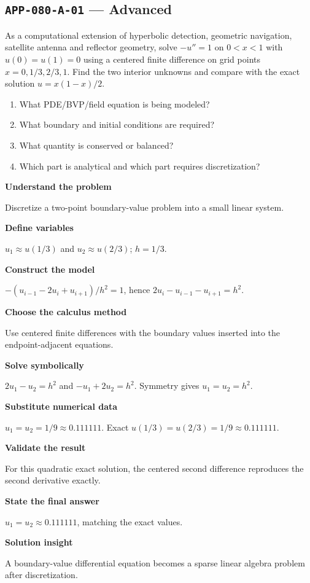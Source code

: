 \documentclass[11pt]{book}
\newcommand{\pid}[1]{\texttt{#1}}
\begin{document}
\subsection*{\pid{APP-080-A-01} — Advanced}
\begin{problembox}
As a computational extension of hyperbolic detection, geometric navigation, satellite antenna and reflector geometry, solve $-u''=1$ on $0<x<1$ with $u(0)=u(1)=0$ using a centered finite difference on grid points $x=0,1/3,2/3,1$. Find the two interior unknowns and compare with the exact solution $u=x(1-x)/2$.
\end{problembox}
\begin{promptbox}\begin{enumerate}
\item What PDE/BVP/field equation is being modeled?
\item What boundary and initial conditions are required?
\item What quantity is conserved or balanced?
\item Which part is analytical and which part requires discretization?
\end{enumerate}\end{promptbox}
\begin{solutionbox}
\textbf{Understand the problem}\par Discretize a two-point boundary-value problem into a small linear system.\par\medskip
\textbf{Define variables}\par $u_1\approx u(1/3)$ and $u_2\approx u(2/3)$; $h=1/3$.\par\medskip
\textbf{Construct the model}\par $-(u_{i-1}-2u_i+u_{i+1})/h^2=1$, hence $2u_i-u_{i-1}-u_{i+1}=h^2$.\par\medskip
\textbf{Choose the calculus method}\par Use centered finite differences with the boundary values inserted into the endpoint-adjacent equations.\par\medskip
\textbf{Solve symbolically}\par $2u_1-u_2=h^2$ and $-u_1+2u_2=h^2$. Symmetry gives $u_1=u_2=h^2$.\par\medskip
\textbf{Substitute numerical data}\par $u_1=u_2=1/9\approx 0.111111$. Exact $u(1/3)=u(2/3)=1/9\approx 0.111111$.\par\medskip
\textbf{Validate the result}\par For this quadratic exact solution, the centered second difference reproduces the second derivative exactly.\par\medskip
\textbf{State the final answer}\par $u_1=u_2\approx 0.111111$, matching the exact values.\par\medskip
\textbf{Solution insight}\par A boundary-value differential equation becomes a sparse linear algebra problem after discretization.\par\medskip
\end{solutionbox}
\end{document}
